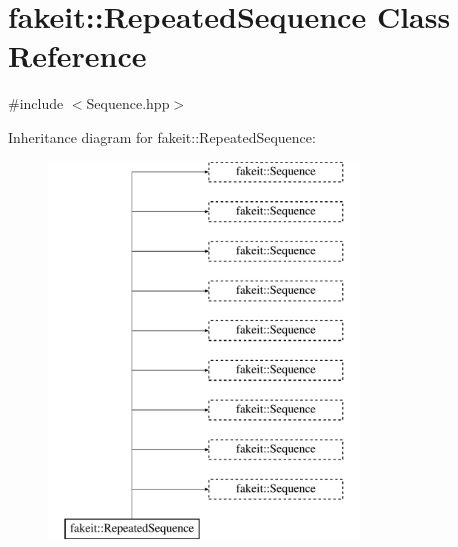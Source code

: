 \hypertarget{classfakeit_1_1RepeatedSequence}{}\section{fakeit\+::Repeated\+Sequence Class Reference}
\label{classfakeit_1_1RepeatedSequence}


{\ttfamily \#include $<$Sequence.\+hpp$>$}

Inheritance diagram for fakeit\+::Repeated\+Sequence\+:\begin{figure}[H]
\begin{center}
\leavevmode
\includegraphics[height=10.000000cm]{classfakeit_1_1RepeatedSequence}
\end{center}
\end{figure}
